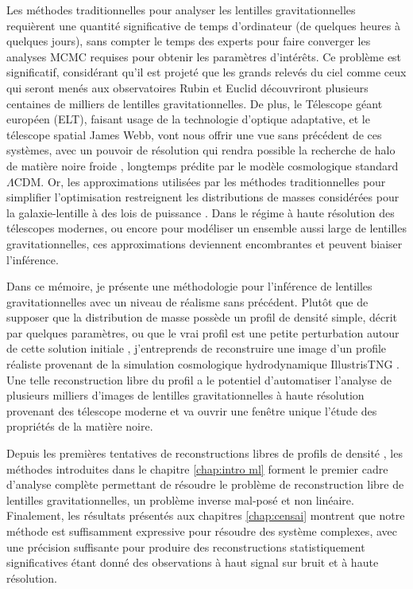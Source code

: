 Les méthodes traditionnelles pour analyser les lentilles gravitationnelles requièrent une quantité 
significative de temps d’ordinateur (de quelques heures à quelques jours), sans compter le temps des 
experts pour faire converger les analyses MCMC requises pour obtenir les paramètres d'intérêts. 
Ce problème est significatif, considérant qu'il est projeté que  
les grands relevés du ciel comme ceux qui seront menés aux observatoires Rubin et Euclid découvriront plusieurs 
centaines de milliers de lentilles gravitationnelles.  
De plus, le Télescope géant européen (ELT), faisant usage de la technologie d'optique adaptative, 
et le télescope spatial James Webb, vont nous offrir une vue sans précédent de ces systèmes, avec un 
pouvoir de résolution qui rendra possible la recherche de halo de matière noire froide \citep[p. ex.][]{Coogan2020}, 
longtemps prédite par le modèle cosmologique standard $\Lambda$CDM. 
Or, les approximations utilisées par les méthodes 
traditionnelles pour simplifier l'optimisation 
restreignent les distributions de masses considérées pour la galaxie-lentille à des lois de puissance \citep[p. ex.][]{Nightingale2018,Etherington2022}. 
Dans le régime à haute résolution des télescopes modernes, ou encore 
pour modéliser un ensemble aussi large de lentilles gravitationnelles, ces approximations deviennent 
encombrantes et peuvent biaiser l'inférence.

Dans ce mémoire, je présente une méthodologie pour l'inférence de lentilles gravitationnelles avec 
un niveau de réalisme sans précédent. Plutôt que de supposer que la distribution de masse possède 
un profil de densité simple, décrit par quelques paramètres, ou que le vrai profil est une petite perturbation 
autour de cette solution initiale \citep{Birrer2015,Birrer2018}, j'entreprends de reconstruire une image d'un profile réaliste 
provenant de la simulation cosmologique hydrodynamique IllustrisTNG \citep{Nelson2018}. 
Une telle reconstruction libre du profil a le potentiel d'automatiser l'analyse de plusieurs 
milliers d'images de lentilles gravitationnelles à haute résolution provenant des télescope 
moderne et va ouvrir une fenêtre unique l'étude des propriétés de la matière noire. 


Depuis les premières 
tentatives de reconstructions libres de profils de densité \citep{Saha1997}, 
les méthodes introduites dans le chapitre \ref{chap:intro ml} forment le premier cadre d'analyse 
complète permettant de résoudre le problème de reconstruction libre de lentilles 
gravitationnelles, un problème inverse mal-posé et non linéaire. 
Finalement, les résultats présentés aux chapitres \ref{chap:censai} montrent que notre 
méthode est suffisamment expressive pour résoudre des système complexes, avec une précision 
suffisante pour produire des reconstructions 
statistiquement significatives étant donné des observations à haut signal sur bruit et  
à haute résolution.



